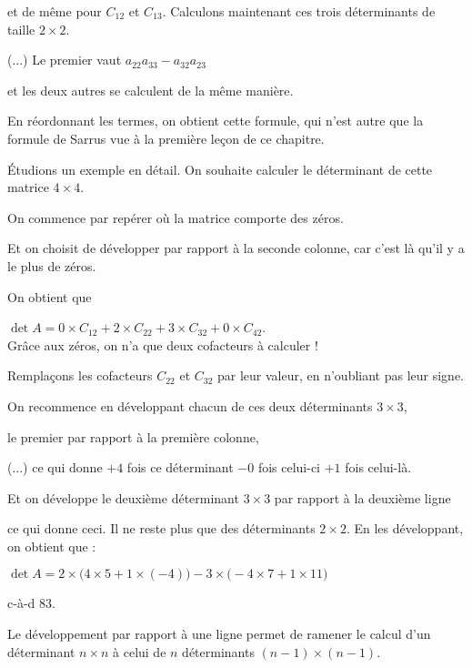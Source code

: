 \change
et de même pour $C_{12}$ et $C_{13}$. Calculons maintenant ces trois déterminants de taille $2\times 2$.

\change
(...)
\newpage	
Le premier vaut $a_{22}a_{33}-a_{32}a_{23}$ 

\change
et les deux autres se calculent de la même manière.

\change
En réordonnant les termes, on obtient cette formule, qui n'est autre que la formule de Sarrus 
vue à la première leçon de ce chapitre.


\diapo

\'Etudions un exemple en détail. On souhaite calculer le déterminant de cette matrice $4\times 4$.

On commence par repérer où la matrice comporte des zéros.

\change
Et on choisit de développer par rapport à la seconde colonne, car c'est là qu'il y a le plus de zéros.

\change
On obtient que 

$\det A = 0 \times C_{12} + 2 \times  C_{22} + 3 \times  C_{32}+0 \times  C_{42}$.\\

Grâce aux zéros, on n'a que deux cofacteurs à calculer !

\change
Remplaçons les cofacteurs $C_{22}$ et $C_{32}$ par leur valeur, en n'oubliant pas leur signe.

\change
On recommence en développant chacun de ces deux déter\-minants $3\times 3$,

\change
le premier par rapport à la première colonne,

\change
(...)
\newpage	
ce qui donne $+4$ fois ce déterminant $-0$ fois celui-ci $+1$ fois celui-là.

\change
Et on développe le deuxième déterminant $3\times 3$ par rapport à la deuxième ligne

\change
ce qui donne ceci. Il ne reste plus que des déterminants $2\times 2$. En les développant, on obtient que :

\change
$\det A =2 \times \big(4\times 5 +1\times(-4)\big) -3 \times \big(-4\times7 +1\times11  \big) $

\change
c-à-d $ 83$.


\diapo

Le développement par rapport à une ligne permet de ramener 
le calcul d'un déterminant $n\times n$ à celui de $n$ déterminants 
$(n-1)\times(n-1)$. 

